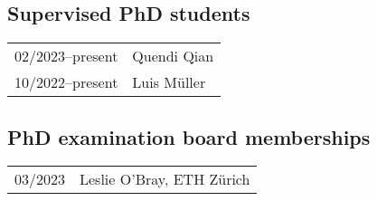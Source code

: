 \documentclass[10pt, a4paper, DIV=14, headings=small]{scrartcl}
\begin{document}
\subsection*{Supervised PhD students}
\begin{longtabu}{p{2.1cm}p{12.0cm}}
	02/2023--present & Quendi Qian \\
	10/2022--present & Luis Müller \\
\end{longtabu}

\subsection*{PhD examination board memberships}
\begin{longtabu}{p{2.1cm}p{12.0cm}}
	03/2023 &  Leslie O'Bray, ETH Zürich \\
\end{longtabu}
\end{document}
